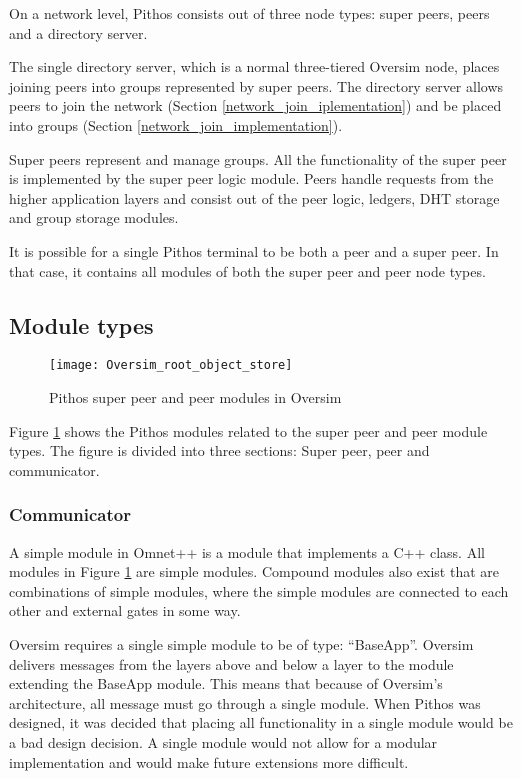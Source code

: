 On a network level, Pithos consists out of three node types: super peers, peers and a directory server.

The single directory server, which is a normal three-tiered Oversim node, places joining peers into groups represented by super peers. The directory server allows peers to join the network (Section \ref{network_join_iplementation}) and be placed into groups (Section \ref{network_join_implementation}).

Super peers represent and manage groups. All the functionality of the super peer is implemented by the super peer logic module. Peers handle requests from the higher application layers and consist out of the peer logic, ledgers, DHT storage and group storage modules.

It is possible for a single Pithos terminal to be both a peer and a super peer. In that case, it contains all modules of both the super peer and peer node types.

\subsection{Module types}
\label{pithos_module_types}

\begin{figure}[htbp]
 \centering
 \texttt{[image: Oversim\_root\_object\_store]}
 \caption{Pithos super peer and peer modules in Oversim}
 \label{fig_oversim_root_object_store}
\end{figure}
%
Figure \ref{fig_oversim_root_object_store} shows the Pithos modules related to the super peer and peer module types. The figure is divided into three sections: Super peer, peer and communicator.

\subsubsection{Communicator}

A simple module in Omnet++ is a module that implements a C++ class. All modules in Figure \ref{fig_oversim_root_object_store} are simple modules. Compound modules also exist that are combinations of simple modules, where the simple modules are connected to each other and external gates in some way.

Oversim requires a single simple module to be of type: ``BaseApp''. Oversim delivers messages from the layers above and below a layer to the module extending the BaseApp module. This means that because of Oversim's architecture, all message must go through a single module. When Pithos was designed, it was decided that placing all functionality in a single module would be a bad design decision. A single module would not allow for a modular implementation and would make future extensions more difficult.

